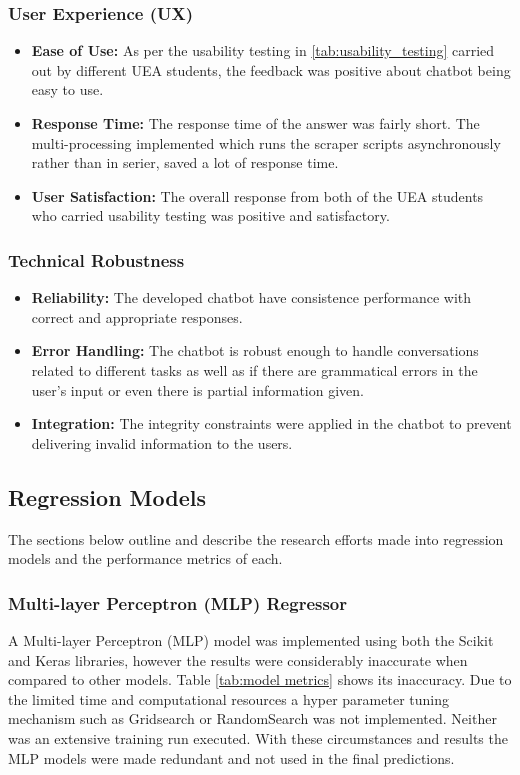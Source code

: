 \subsubsection{User Experience (UX)}
\begin{itemize}
    \item \textbf{Ease of Use:} As per the usability testing in \ref{tab:usability_testing} carried out by different UEA students, the feedback was positive about chatbot being easy to use.
    \item \textbf{Response Time:} The response time of the answer was fairly short. The multi-processing implemented which runs the scraper scripts asynchronously rather than in serier, saved a lot of response time.
    \item \textbf{User Satisfaction:} The overall response from both of the UEA students who carried usability testing was positive and satisfactory.
\end{itemize} 

\subsubsection{Technical Robustness}
\begin{itemize}
    \item \textbf{Reliability:} The developed chatbot have consistence performance with correct and appropriate responses.
    \item \textbf{Error Handling:} The chatbot is robust enough to handle conversations related to different tasks as well as if there are grammatical errors in the user's input or even there is partial information given.
    \item \textbf{Integration:} The integrity constraints were applied in the chatbot to prevent delivering invalid information to the users.
\end{itemize}


\subsection{Regression Models}
The sections below outline and describe the research efforts made into regression models and the performance metrics of each.
\subsubsection{Multi-layer Perceptron (MLP) Regressor}
A Multi-layer Perceptron (MLP) model was implemented using both the Scikit and Keras libraries, however the results were considerably inaccurate when compared to other models. Table \ref{tab:model metrics} shows its inaccuracy. Due to the limited time and computational resources a hyper parameter tuning mechanism such as Gridsearch or RandomSearch was not implemented. Neither was an extensive training run executed. With these circumstances and results the MLP models were made redundant and not used in the final predictions.

